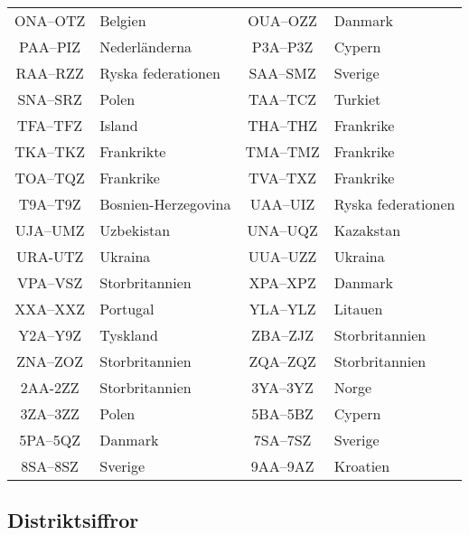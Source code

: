 \begin{center}
\begin{longtable}{cl|cl}
	      ONA--OTZ        & Belgien              &    OUA--OZZ     & Danmark               \\
	      PAA--PIZ        & Nederländerna        &    P3A--P3Z     & Cypern                \\
	      RAA--RZZ        & Ryska federationen   &    SAA--SMZ     & Sverige               \\
	      SNA--SRZ        & Polen                &    TAA--TCZ     & Turkiet               \\
	      TFA--TFZ        & Island               &    THA--THZ     & Frankrike             \\
	      TKA--TKZ        & Frankrikte           &    TMA--TMZ     & Frankrike             \\
	      TOA--TQZ        & Frankrike            &    TVA--TXZ     & Frankrike             \\
	      T9A--T9Z        & Bosnien-Herzegovina  &    UAA--UIZ     & Ryska federationen    \\
	      UJA--UMZ        & Uzbekistan           &    UNA--UQZ     & Kazakstan             \\
	       URA-UTZ        & Ukraina              &    UUA--UZZ     & Ukraina               \\
	      VPA--VSZ        & Storbritannien       &    XPA--XPZ     & Danmark               \\
	      XXA--XXZ        & Portugal             &    YLA--YLZ     & Litauen               \\
	      Y2A--Y9Z        & Tyskland             &    ZBA--ZJZ     & Storbritannien        \\
	      ZNA--ZOZ        & Storbritannien       &    ZQA--ZQZ     & Storbritannien        \\
	       2AA-2ZZ        & Storbritannien       &    3YA--3YZ     & Norge                 \\
	      3ZA--3ZZ        & Polen                &    5BA--5BZ     & Cypern                \\
	      5PA--5QZ        & Danmark              &    7SA--7SZ     & Sverige               \\
	      8SA--8SZ        & Sverige              &    9AA--9AZ     & Kroatien
\end{longtable}
\end{center}

\subsection{Distriktsiffror}

